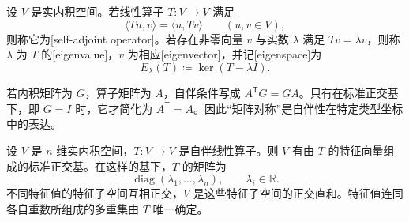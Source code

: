\begin{definition}
	\label{g1:def:self-adjoint}
	设 \(V\) 是实内积空间。若线性算子 \(T\colon V\rightarrow V\) 满足
	\[
		\langle Tu,v\rangle=\langle u,Tv\rangle\qquad(u,v\in V),
	\]
	则称它为[self-adjoint operator]。若存在非零向量 \(v\) 与实数 \(\lambda\) 满足 \(Tv=\lambda v\)，则称 \(\lambda\) 为 \(T\) 的[eigenvalue]，\(v\) 为相应[eigenvector]，并记[eigenspace]为
	\[
		E_\lambda(T)\coloneqq\ker(T-\lambda I).
	\]
\end{definition}

若内积矩阵为 \(G\)，算子矩阵为 \(A\)，自伴条件写成 \(A^{\mathsf T}G=GA\)。只有在标准正交基下，即 \(G=I\) 时，它才简化为 \(A^{\mathsf T}=A\)。因此“矩阵对称”是自伴性在特定类型坐标中的表达。

\begin{theorem}[实自伴谱定理]
	\label{g1:thm:spectral}
	设 \(V\) 是 \(n\) 维实内积空间，\(T\colon V\rightarrow V\) 是自伴线性算子。则 \(V\) 有由 \(T\) 的特征向量组成的标准正交基。在这样的基下，\(T\) 的矩阵为
	\[
		\operatorname{diag}(\lambda_1,\ldots,\lambda_n),\qquad\lambda_i\in\mathbb R.
	\]
	不同特征值的特征子空间互相正交，\(V\) 是这些特征子空间的正交直和。特征值连同各自重数所组成的多重集由 \(T\) 唯一确定。
\end{theorem}

